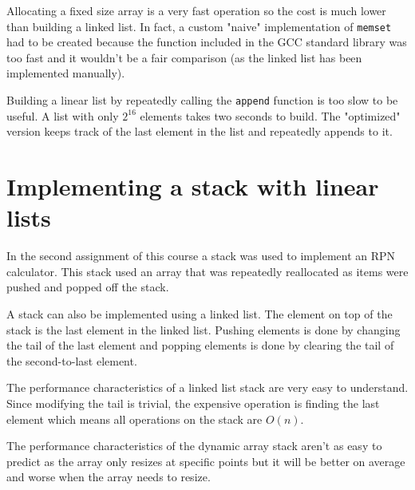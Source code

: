 \documentclass[a4paper,11pt]{article}
\begin{document}
\begin{table}[H]
\centering
{}
\end{table}

Allocating a fixed size array is a very fast operation so the cost is much lower than building a linked list.
In fact, a custom "naive" implementation of \texttt{memset} had to be created because the function included in the GCC standard library was too fast and it wouldn't be a fair comparison (as the linked list has been implemented manually).

Building a linear list by repeatedly calling the \texttt{append} function is too slow to be useful. A list with only $2^{16}$ elements takes two seconds to build. The "optimized" version keeps track of the last element in the list and repeatedly appends to it.

\section*{Implementing a stack with linear lists}

In the second assignment of this course a stack was used to implement an RPN calculator.
This stack used an array that was repeatedly reallocated as items were pushed and popped off the stack.

A stack can also be implemented using a linked list. The element on top of the stack is the last element in the linked list.
Pushing elements is done by changing the tail of the last element and popping elements is done by clearing the tail of the second-to-last element.

The performance characteristics of a linked list stack are very easy to understand.
Since modifying the tail is trivial, the expensive operation is finding the last element which means all operations on the stack are $O(n)$.

The performance characteristics of the dynamic array stack aren't as easy to predict as the array only resizes at specific points but it will be better on average and worse when the array needs to resize.
\end{document}
